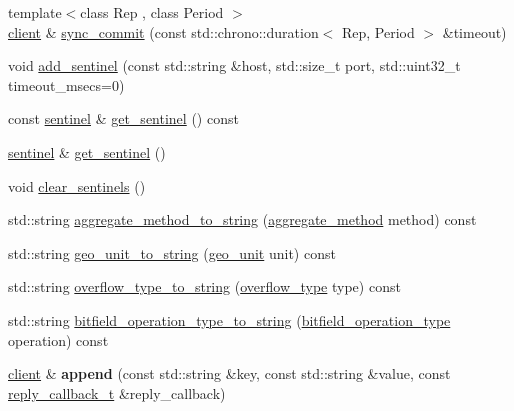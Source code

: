 \begin{DoxyCompactItemize}
\item 
{\footnotesize template$<$class Rep , class Period $>$ }\\\mbox{\hyperlink{classcpp__redis_1_1client}{client}} \& \mbox{\hyperlink{classcpp__redis_1_1client_a79a24c8367cb1229fd2c4c38d0f82533}{sync\+\_\+commit}} (const std\+::chrono\+::duration$<$ Rep, Period $>$ \&timeout)
\item 
void \mbox{\hyperlink{classcpp__redis_1_1client_abd52019ee708559179c501892e6448dc}{add\+\_\+sentinel}} (const std\+::string \&host, std\+::size\+\_\+t port, std\+::uint32\+\_\+t timeout\+\_\+msecs=0)
\item 
const \mbox{\hyperlink{classcpp__redis_1_1sentinel}{sentinel}} \& \mbox{\hyperlink{classcpp__redis_1_1client_a8325d57c88811254f9f9dab8030d7e8c}{get\+\_\+sentinel}} () const
\item 
\mbox{\hyperlink{classcpp__redis_1_1sentinel}{sentinel}} \& \mbox{\hyperlink{classcpp__redis_1_1client_a2fa17b8fbc245a190389d95083857cc4}{get\+\_\+sentinel}} ()
\item 
void \mbox{\hyperlink{classcpp__redis_1_1client_ad693f26b02113e4a776856aca8dd7796}{clear\+\_\+sentinels}} ()
\item 
std\+::string \mbox{\hyperlink{classcpp__redis_1_1client_accc567df4dd23b30defdd9605719e0ca}{aggregate\+\_\+method\+\_\+to\+\_\+string}} (\mbox{\hyperlink{classcpp__redis_1_1client_aa197ca5b36da793c701d3ba388ec4946}{aggregate\+\_\+method}} method) const
\item 
std\+::string \mbox{\hyperlink{classcpp__redis_1_1client_aa8a686097a5340eb50e838f14342e302}{geo\+\_\+unit\+\_\+to\+\_\+string}} (\mbox{\hyperlink{classcpp__redis_1_1client_aa5998536fd32ff4387c89be514997620}{geo\+\_\+unit}} unit) const
\item 
std\+::string \mbox{\hyperlink{classcpp__redis_1_1client_a696a7fa2b06245323eca8c232d307585}{overflow\+\_\+type\+\_\+to\+\_\+string}} (\mbox{\hyperlink{classcpp__redis_1_1client_a4119182ad3a01c1bb626a174375e114a}{overflow\+\_\+type}} type) const
\item 
std\+::string \mbox{\hyperlink{classcpp__redis_1_1client_a11a73f30d14e6d27f6c8c8cee53a3a04}{bitfield\+\_\+operation\+\_\+type\+\_\+to\+\_\+string}} (\mbox{\hyperlink{classcpp__redis_1_1client_a2e2023534299541da0a659802e2f087d}{bitfield\+\_\+operation\+\_\+type}} operation) const
\item 
\mbox{\label{classcpp__redis_1_1client_ad60647638d8758103e98894457652b84}} 
\mbox{\hyperlink{classcpp__redis_1_1client}{client}} \& {\bfseries append} (const std\+::string \&key, const std\+::string \&value, const \mbox{\hyperlink{classcpp__redis_1_1client_af7a65eb21aa25230bfbb0b0203c4fc04}{reply\+\_\+callback\+\_\+t}} \&reply\+\_\+callback)

\end{DoxyCompactItemize}
